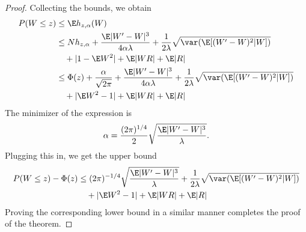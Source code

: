 \begin{proof}
  Collecting the bounds, we obtain
  \begin{equation}
    \begin{split}
      P(W \leq z) &\leq \E h_{z,\alpha}(W) \\
      &\leq Nh_{z,\alpha} + \frac{\E |W'-W|^3}{4 \alpha \lambda}
      + \frac{1}{2\lambda} \sqrt{\var (\E [(W'-W)^2|W])} \\
      &\quad + |1 - \E W^2| + \E |WR| + \E |R| \\
      &\leq \Phi (z) + \frac{\alpha}{\sqrt{2\pi}} + \frac{\E |W'-W|^3}{4 \alpha \lambda}
      + \frac{1}{2\lambda} \sqrt{\var (\E [(W'-W)^2|W])} \\
      &\quad + |\E W^2 - 1| + \E |WR| + \E |R|
    \end{split}
  \end{equation}
  The minimizer of the expression is
  \begin{equation}
    \alpha = \frac{(2\pi)^{1/4}}{2}\sqrt{\frac{\E |W'-W|^3}{\lambda}}.
  \end{equation}
  Plugging this in, we get the upper bound
  \begin{equation}
    \begin{split}
      P(W \leq z) - \Phi(z) &\leq (2\pi)^{-1/4} \sqrt{\frac{\E |W'-W|^3}{\lambda}}
      + \frac{1}{2\lambda} \sqrt{\var (\E [(W'-W)^2|W])} \\
      &\quad + |\E W^2 - 1| + \E |WR| + \E |R|
    \end{split}
  \end{equation}
  Proving the corresponding lower bound in a similar manner completes the proof of the theorem.
\end{proof}

